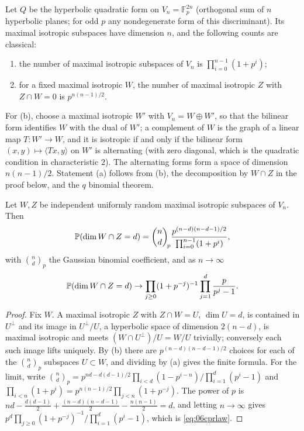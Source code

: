 Let $Q$ be the hyperbolic quadratic form on $V_n = \mathbb{F}_p^{2n}$ (orthogonal sum of $n$ hyperbolic planes; for odd $p$ any nondegenerate form of this discriminant). Its maximal isotropic subspaces have dimension $n$, and the following counts are classical:
\begin{enumerate}[label=(\alph*)]
\item the number of maximal isotropic subspaces of $V_n$ is $\prod_{i=0}^{n-1}(1+p^i)$;
\item for a fixed maximal isotropic $W$, the number of maximal isotropic $Z$ with $Z\cap W = 0$ is $p^{n(n-1)/2}$.
\end{enumerate}
For (b), choose a maximal isotropic $W'$ with $V_n = W\oplus W'$, so that the bilinear form identifies $W$ with the dual of $W'$; a complement of $W$ is the graph of a linear map $T:W'\to W$, and it is isotropic if and only if the bilinear form $(x,y)\mapsto\langle Tx,y\rangle$ on $W'$ is alternating (with zero diagonal, which is the quadratic condition in characteristic $2$). The alternating forms form a space of dimension $n(n-1)/2$. Statement (a) follows from (b), the decomposition by $W\cap Z$ in the proof below, and the $q$ binomial theorem.

\begin{theorem}\label{thm:06cpr}
Let $W,Z$ be independent uniformly random maximal isotropic subspaces of $V_n$. Then
\[
\mathbb{P}(\dim W\cap Z = d) = \binom{n}{d}_{\!p}\frac{p^{(n-d)(n-d-1)/2}}{\prod_{i=0}^{n-1}(1+p^i)},
\]
with $\binom{n}{d}_p$ the Gaussian binomial coefficient, and as $n\to\infty$
\begin{equation}\label{eq:06cprlaw}
\mathbb{P}(\dim W\cap Z = d)\to\prod_{j\ge0}(1+p^{-j})^{-1}\prod_{j=1}^d\frac{p}{p^j-1}.
\end{equation}
\end{theorem}

\begin{proof}
Fix $W$. A maximal isotropic $Z$ with $Z\cap W = U$, $\dim U = d$, is contained in $U^\perp$ and its image in $U^\perp/U$, a hyperbolic space of dimension $2(n-d)$, is maximal isotropic and meets $(W\cap U^\perp)/U = W/U$ trivially; conversely each such image lifts uniquely. By (b) there are $p^{(n-d)(n-d-1)/2}$ choices for each of the $\binom nd_p$ subspaces $U\subset W$, and dividing by (a) gives the finite formula. For the limit, write $\binom nd_p = p^{nd-d(d-1)/2}\prod_{i<d}(1-p^{i-n})/\prod_{i=1}^d(p^i-1)$ and $\prod_{i<n}(1+p^i) = p^{n(n-1)/2}\prod_{j<n}(1+p^{-j})$. The power of $p$ is $nd-\frac{d(d-1)}2+\frac{(n-d)(n-d-1)}2-\frac{n(n-1)}2 = d$, and letting $n\to\infty$ gives $p^d\prod_{j\ge0}(1+p^{-j})^{-1}/\prod_{i=1}^d(p^i-1)$, which is \eqref{eq:06cprlaw}.
\end{proof}

